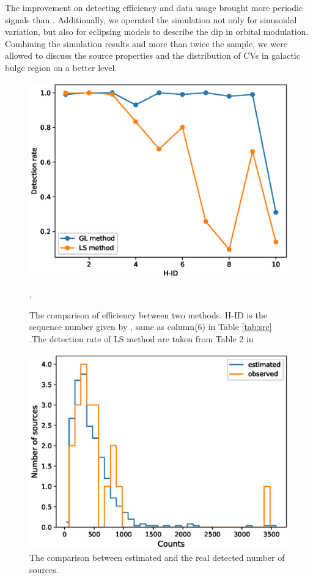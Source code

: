 \documentclass[twoside,twocolumn]{aastex63}
\begin{document}
The improvement on detecting efficiency and data usage brought more periodic signals than \cite{2012ApJ...746..165H}. Additionally, we operated the simulation not only for sinusoidal variation, but also for eclipsing models to describe the dip in orbital modulation. Combining the simulation results and more than twice the sample, we were allowed to discuss the source properties and the distribution of CVs in galactic bulge region on a better level.

\begin{figure}[htb]
\includegraphics[scale=0.55]{./figure/sim_LW/Pdet_com.eps}
\caption{The comparison of efficiency between two methods. H-ID is the sequence number given by \cite{2012ApJ...746..165H}, same as column(6) in Table \ref{tab:src} \label{fig:com}.The detection rate of LS method are taken from Table 2 in \cite{2012ApJ...746..165H}}.
\end{figure}
\begin{figure}[htbp]
\includegraphics[scale=0.53]{./figure/sim_LW/est_obs.eps}
\caption{The comparison between estimated and the real detected number of sources. \label{fig:NP_sim}}
\end{figure}
\end{document}
